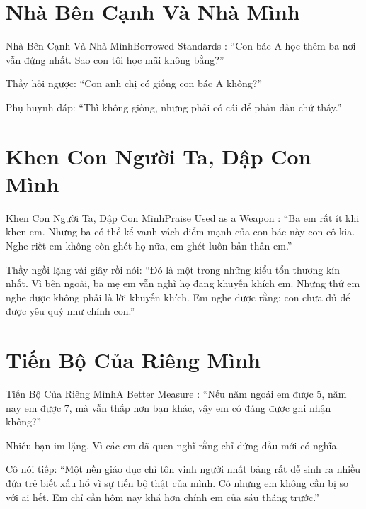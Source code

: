 \section{Nhà Bên Cạnh Và Nhà Mình}
\begin{truyen}{Nhà Bên Cạnh Và Nhà Mình}{Borrowed Standards}
: ``Con bác A học thêm ba nơi vẫn đứng nhất. Sao con tôi học mãi không bằng?''

Thầy hỏi ngược: ``Con anh chị có giống con bác A không?''

Phụ huynh đáp: ``Thì không giống, nhưng phải có cái để phấn đấu chứ thầy.''

\end{truyen}

\section{Khen Con Người Ta, Dập Con Mình}
\begin{truyen}{Khen Con Người Ta, Dập Con Mình}{Praise Used as a Weapon}
: ``Ba em rất ít khi khen em. Nhưng ba có thể kể vanh vách điểm mạnh của con bác này con cô kia. Nghe riết em không còn ghét họ nữa, em ghét luôn bản thân em.''

Thầy ngồi lặng vài giây rồi nói: ``Đó là một trong những kiểu tổn thương kín nhất. Vì bên ngoài, ba mẹ em vẫn nghĩ họ đang khuyến khích em. Nhưng thứ em nghe được không phải là lời khuyến khích. Em nghe được rằng: con chưa đủ để được yêu quý như chính con.''
\end{truyen}

\section{Tiến Bộ Của Riêng Mình}
\begin{truyen}{Tiến Bộ Của Riêng Mình}{A Better Measure}
: ``Nếu năm ngoái em được 5, năm nay em được 7, mà vẫn thấp hơn bạn khác, vậy em có đáng được ghi nhận không?''

Nhiều bạn im lặng. Vì các em đã quen nghĩ rằng chỉ đứng đầu mới có nghĩa.

Cô nói tiếp: ``Một nền giáo dục chỉ tôn vinh người nhất bảng rất dễ sinh ra nhiều đứa trẻ biết xấu hổ vì sự tiến bộ thật của mình. Có những em không cần bị so với ai hết. Em chỉ cần hôm nay khá hơn chính em của sáu tháng trước.''
\end{truyen}


